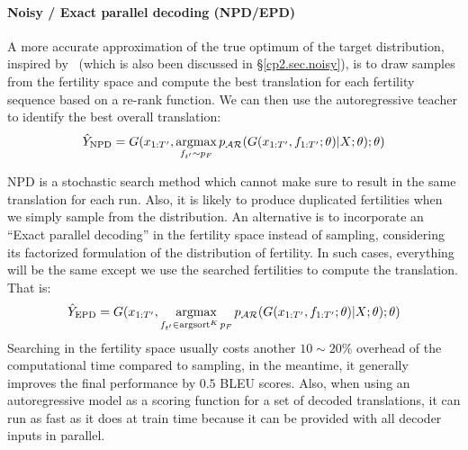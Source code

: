 \paragraph{Noisy / Exact parallel decoding (NPD/EPD)} A more accurate approximation of the true optimum of the target distribution, inspired by~\citet{cho2016noisy} (which is also been discussed in \S\ref{cp2.sec.noisy}), is to draw samples from the fertility space and compute the best translation for each fertility sequence based on  a re-rank function.
We can then use the autoregressive teacher to identify the best overall translation:
\begin{equation}
\hat{Y}_\text{NPD} = G(x_{1:T'}, \mathop{\text{argmax}}_{f_{t'} \sim p_F} p_{\mathcal{AR}}(G(x_{1:T'}, f_{1:T'};\theta)|X;\theta);\theta)
\end{equation}

NPD is a stochastic search method which cannot make sure to result in the same translation for each run. Also, it is likely to produce duplicated fertilities when we simply sample from the distribution. An alternative is to incorporate an ``Exact parallel decoding'' in the fertility space instead of sampling, considering its factorized formulation of the distribution of fertility. In such cases, everything will be the same except we use the searched fertilities  to compute the translation. That is:
\begin{equation}
\hat{Y}_\text{EPD} = G(x_{1:T'}, \mathop{\text{argmax}}_{f_{t'}  \in \operatorname{\text{argsort}}^K p_F} p_{\mathcal{AR}}(G(x_{1:T'}, f_{1:T'};\theta)|X;\theta);\theta)
\end{equation}
Searching in the fertility space usually costs another $10\sim20\%$ overhead of the computational time compared to sampling, in the meantime, it generally improves the final performance by $0.5$ BLEU scores.
Also, when using an autoregressive model as a scoring function for a set of decoded translations, it can run as fast as it does at train time because it can be provided with all decoder inputs in parallel.

